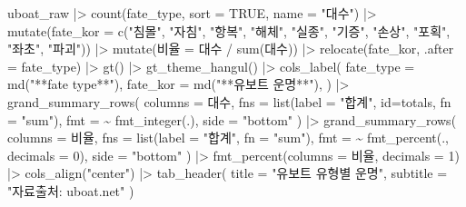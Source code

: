 \documentclass[
  letterpaper,
  chapter,a4paper,showtrims,openright,hidelinks]{oblivoir}
\newenvironment{Shaded}{\begin{snugshade}}{\end{snugshade}}
\newcommand{\AttributeTok}[1]{\textcolor[rgb]{0.40,0.45,0.13}{#1}}
\newcommand{\ConstantTok}[1]{\textcolor[rgb]{0.56,0.35,0.01}{#1}}
\newcommand{\DecValTok}[1]{\textcolor[rgb]{0.68,0.00,0.00}{#1}}
\newcommand{\FunctionTok}[1]{\textcolor[rgb]{0.28,0.35,0.67}{#1}}
\newcommand{\NormalTok}[1]{\textcolor[rgb]{0.00,0.23,0.31}{#1}}
\newcommand{\OtherTok}[1]{\textcolor[rgb]{0.00,0.23,0.31}{#1}}
\newcommand{\SpecialCharTok}[1]{\textcolor[rgb]{0.37,0.37,0.37}{#1}}
\newcommand{\StringTok}[1]{\textcolor[rgb]{0.13,0.47,0.30}{#1}}
\begin{document}
\begin{Shaded}
\begin{Highlighting}[]
\NormalTok{uboat\_raw }\SpecialCharTok{|\textgreater{}} 
  \FunctionTok{count}\NormalTok{(fate\_type, }\AttributeTok{sort =} \ConstantTok{TRUE}\NormalTok{, }\AttributeTok{name =} \StringTok{"대수"}\NormalTok{) }\SpecialCharTok{|\textgreater{}} 
  \FunctionTok{mutate}\NormalTok{(}\AttributeTok{fate\_kor =} \FunctionTok{c}\NormalTok{(}\StringTok{"침몰"}\NormalTok{, }\StringTok{"자침"}\NormalTok{, }\StringTok{"항복"}\NormalTok{, }\StringTok{"해체"}\NormalTok{, }\StringTok{"실종"}\NormalTok{, }\StringTok{"기증"}\NormalTok{, }\StringTok{"손상"}\NormalTok{, }\StringTok{"포획"}\NormalTok{, }\StringTok{"좌초"}\NormalTok{, }\StringTok{"파괴"}\NormalTok{)) }\SpecialCharTok{|\textgreater{}} 
  \FunctionTok{mutate}\NormalTok{(비율 }\OtherTok{=}\NormalTok{ 대수 }\SpecialCharTok{/} \FunctionTok{sum}\NormalTok{(대수)) }\SpecialCharTok{|\textgreater{}}  
  \FunctionTok{relocate}\NormalTok{(fate\_kor, }\AttributeTok{.after =}\NormalTok{ fate\_type) }\SpecialCharTok{|\textgreater{}} 
  \FunctionTok{gt}\NormalTok{() }\SpecialCharTok{|\textgreater{}} 
    \FunctionTok{gt\_theme\_hangul}\NormalTok{() }\SpecialCharTok{|\textgreater{}}   
    \FunctionTok{cols\_label}\NormalTok{(}
        \AttributeTok{fate\_type =} \FunctionTok{md}\NormalTok{(}\StringTok{"**fate type**"}\NormalTok{),}
        \AttributeTok{fate\_kor =} \FunctionTok{md}\NormalTok{(}\StringTok{"**유보트 운명**"}\NormalTok{),}
\NormalTok{    ) }\SpecialCharTok{|\textgreater{}} 
    \FunctionTok{grand\_summary\_rows}\NormalTok{(}
      \AttributeTok{columns =}\NormalTok{ 대수,}
      \AttributeTok{fns =}  \FunctionTok{list}\NormalTok{(}\AttributeTok{label =} \StringTok{"합계"}\NormalTok{, }\AttributeTok{id=}\StringTok{\textquotesingle{}totals\textquotesingle{}}\NormalTok{, }\AttributeTok{fn =} \StringTok{"sum"}\NormalTok{),}
      \AttributeTok{fmt =} \SpecialCharTok{\textasciitilde{}} \FunctionTok{fmt\_integer}\NormalTok{(.),}
      \AttributeTok{side =} \StringTok{"bottom"}
\NormalTok{    ) }\SpecialCharTok{|\textgreater{}} 
    \FunctionTok{grand\_summary\_rows}\NormalTok{(}
      \AttributeTok{columns =}\NormalTok{ 비율,}
      \AttributeTok{fns =}  \FunctionTok{list}\NormalTok{(}\AttributeTok{label =} \StringTok{"합계"}\NormalTok{, }\AttributeTok{fn =} \StringTok{"sum"}\NormalTok{),}
      \AttributeTok{fmt =} \SpecialCharTok{\textasciitilde{}} \FunctionTok{fmt\_percent}\NormalTok{(., }\AttributeTok{decimals =} \DecValTok{0}\NormalTok{),}
      \AttributeTok{side =} \StringTok{"bottom"}
\NormalTok{    ) }\SpecialCharTok{|\textgreater{}} 
    \FunctionTok{fmt\_percent}\NormalTok{(}\AttributeTok{columns =}\NormalTok{ 비율, }\AttributeTok{decimals =} \DecValTok{1}\NormalTok{) }\SpecialCharTok{|\textgreater{}} 
    \FunctionTok{cols\_align}\NormalTok{(}\StringTok{"center"}\NormalTok{) }\SpecialCharTok{|\textgreater{}} 
    \FunctionTok{tab\_header}\NormalTok{(}
      \AttributeTok{title =} \StringTok{"유보트 유형별 운명"}\NormalTok{,}
      \AttributeTok{subtitle =} \StringTok{"자료출처: uboat.net"}
\NormalTok{    )}
\end{Highlighting}
\end{Shaded}
\end{document}
